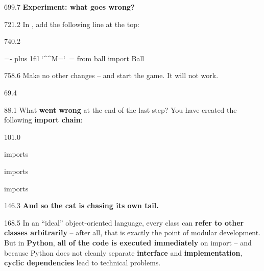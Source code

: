 \documentclass{aslab}
\makeatletter
\newcommand*\imp[1]{\textcolor{codemagenta}{#1}}
\newenvironment{pycode}{\par\ttfamily\hyphenchar\font=-1
  \lineskiplimit=-\maxdimen\lineskip=0pt\parindent=0pt
  \parfillskip=0pt plus 1fil\relax
  \catcode`\^^M=\active\catcode`\ =\active\py@setup\py@gobble}{}
\newcommand*\emo[1]{\makebox[18bp][l]{\emoji{#1}}}
\newcommand*\catemo{\makebox[18bp][l]{{\emojifont ^^^^^^01f408^^^^200d^^^^2b1b}}}
\makeatother
\begin{document}
\begin{region}[x=74.7]{699.7}
\emo{1F9EA}\textbf{Experiment: what goes wrong?}
\end{region}

\begin{region}[x=74.7]{721.2}
In , add the following line at the top:
\end{region}

\begin{region}[x=74.7]{740.2}
\begin{pycode}
\imp{from} ball \imp{import} Ball
\end{pycode}
\end{region}

\begin{region}[x=74.7,right=0]{758.6}
Make no other changes -- and start the game. It will not work.
\end{region}

\nextpage
\begin{region}{69.4}
\end{region}

\begin{region}{88.1}
What \textbf{went wrong} at the end of the last step? You have created the
following \textbf{import chain}:
\end{region}

\begin{region}[pitch=13.5]{101.0}
\begin{dashlist}
\item {} imports 
\item {} imports 
\item {} imports 
\end{dashlist}
\end{region}

\begin{region}{146.3}
\catemo\textbf{And so the cat is chasing its own tail.}
\end{region}

\begin{region}[pitch=14.27]{168.5}
In an ``ideal'' object-oriented language, every class can \textbf{refer to
other classes arbitrarily} -- after all, that is exactly the point of modular
development. But in \textbf{Python}, \textbf{all of the code is executed
immediately} on import -- and because Python does not cleanly separate
\textbf{interface} and \textbf{implementation}, \textbf{cyclic dependencies}
lead to technical problems.
\end{region}
\end{document}
